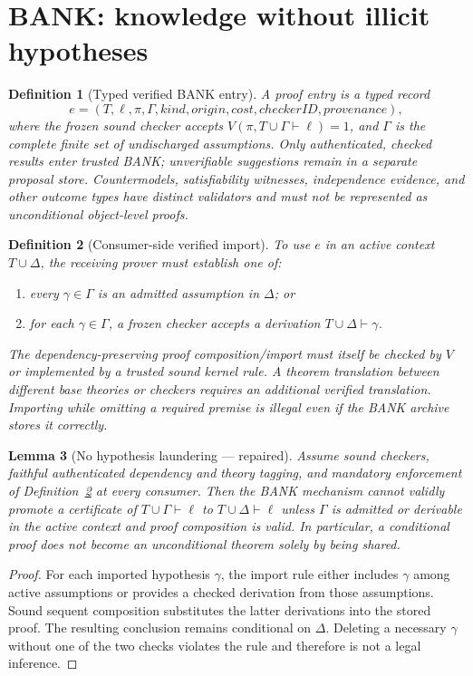 \documentclass[11pt,letterpaper]{article}
\newtheorem{definition}{Definition}[section]
\newtheorem{lemma}[definition]{Lemma}
\theoremstyle{remark}
\begin{document}
\section{BANK: knowledge without illicit hypotheses}
\begin{definition}[Typed verified BANK entry]\label{def:bank}
A proof entry is a typed record
\[e=(T,\ell,\pi,\Gamma,\mathit{kind},\mathit{origin},\mathit{cost},\mathit{checkerID},\mathit{provenance}),\]
where the frozen sound checker accepts $V(\pi,T\cup\Gamma\vdash\ell)=1$, and $\Gamma$ is the complete finite set of undischarged assumptions. Only authenticated, checked results enter trusted BANK; unverifiable suggestions remain in a separate proposal store. Countermodels, satisfiability witnesses, independence evidence, and other outcome types have distinct validators and must not be represented as unconditional object-level proofs.
\end{definition}
\begin{definition}[Consumer-side verified import]\label{def:import}
To use $e$ in an active context $T\cup\Delta$, the receiving prover must establish one of:
\begin{enumerate}[label=(\roman*)]
\item every $\gamma\in\Gamma$ is an admitted assumption in $\Delta$; or
\item for each $\gamma\in\Gamma$, a frozen checker accepts a derivation $T\cup\Delta\vdash\gamma$.
\end{enumerate}
The dependency-preserving proof composition/import must itself be checked by $V$ or implemented by a trusted sound kernel rule. A theorem translation between different base theories or checkers requires an additional verified translation. Importing while omitting a required premise is illegal even if the BANK archive stores it correctly.
\end{definition}
\begin{lemma}[No hypothesis laundering --- repaired]\label{lem:launder}
Assume sound checkers, faithful authenticated dependency and theory tagging, and mandatory enforcement of Definition~\ref{def:import} at \emph{every} consumer. Then the BANK mechanism cannot validly promote a certificate of $T\cup\Gamma\vdash\ell$ to $T\cup\Delta\vdash\ell$ unless $\Gamma$ is admitted or derivable in the active context and proof composition is valid. In particular, a conditional proof does not become an unconditional theorem solely by being shared.
\end{lemma}
\begin{proof}
For each imported hypothesis $\gamma$, the import rule either includes $\gamma$ among active assumptions or provides a checked derivation from those assumptions. Sound sequent composition substitutes the latter derivations into the stored proof. The resulting conclusion remains conditional on $\Delta$. Deleting a necessary $\gamma$ without one of the two checks violates the rule and therefore is not a legal inference.
\end{proof}
\end{document}
